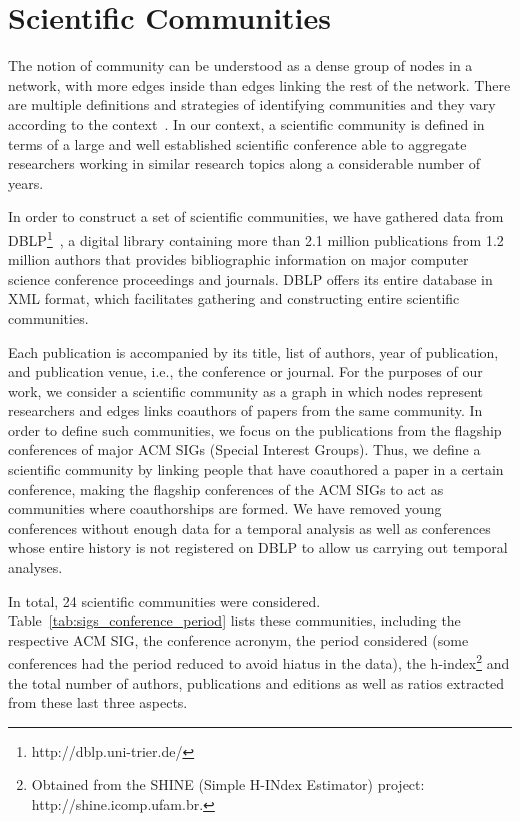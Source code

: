 \section{Scientific Communities}


The notion of community can be understood as a dense group of nodes in a network, with more edges inside than edges linking the rest of the network.  There are multiple definitions
and strategies of identifying communities and they vary according to the context~\cite{Kleinberg@cacm2008,Leskovec@www2010}. In our context, a scientific community is defined in terms of a large and well established
scientific conference able to aggregate researchers working in similar research topics along a considerable number of years. 


In order to construct a set of scientific communities, we have gathered data from DBLP\footnote{http://dblp.uni-trier.de/}~\cite{Ley:2009}, a digital library containing more
than 2.1 million publications from 1.2 million authors that provides bibliographic information on major computer science conference proceedings and journals.  DBLP offers its
entire database in XML format, which facilitates gathering and constructing entire scientific communities. 

Each publication is accompanied by its title, list of authors, year of publication, and publication venue, i.e., the conference or journal. For the purposes of our work, we
consider a scientific community as a graph in which nodes represent researchers and edges links coauthors of papers from the same community.  In order to define such communities,
we focus on the publications from the flagship conferences of major ACM SIGs (Special Interest Groups).  Thus, we define a scientific community by linking people that have
coauthored a paper in a certain conference, making the flagship conferences of the ACM SIGs to act as communities where coauthorships are formed. We have removed young conferences
without enough data for a temporal analysis as well as conferences whose entire history is not registered on DBLP to allow us carrying out temporal analyses. 

In total, 24 scientific communities were considered. Table~\ref{tab:sigs_conference_period} lists these communities, including the respective ACM SIG, the conference acronym, the period
considered (some conferences had the period reduced to avoid hiatus in the data), the h-index\footnote{Obtained from the SHINE (Simple H-INdex Estimator) project:
http://shine.icomp.ufam.br.} and the total number of authors, publications and editions as well as ratios extracted from these last three aspects.

